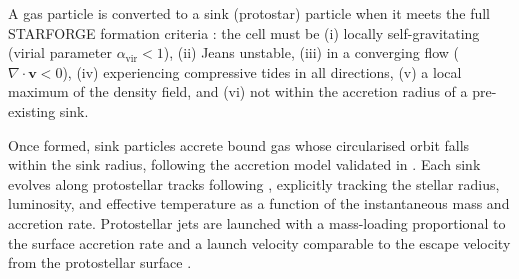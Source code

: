 
A gas particle is converted to a sink (protostar) particle when
it meets the full STARFORGE formation criteria
\citep{STARFORGE_Towa_Grudic_2021}: the cell must be
(i) locally self-gravitating (virial parameter $\alpha_\mathrm{vir} < 1$),
(ii) Jeans unstable,
(iii) in a converging flow ($\nabla \cdot \mathbf{v} < 0$),
(iv) experiencing compressive tides in all directions,
(v) a local maximum of the density field, and
(vi) not within the accretion radius of a pre-existing sink.



Once formed, sink particles accrete bound gas whose circularised
orbit falls within the sink radius, following the accretion
model validated in \citet{STARFORGE_Towa_Grudic_2021}.
Each sink evolves along protostellar tracks following
\citet{Offner_2009}, explicitly tracking the stellar radius,
luminosity, and effective temperature as a function of the
instantaneous mass and accretion rate.
Protostellar jets are launched with a mass-loading proportional
to the surface accretion rate and a launch velocity comparable
to the escape velocity from the protostellar surface
\citep{STARFORGE_Towa_Grudic_2021}.


